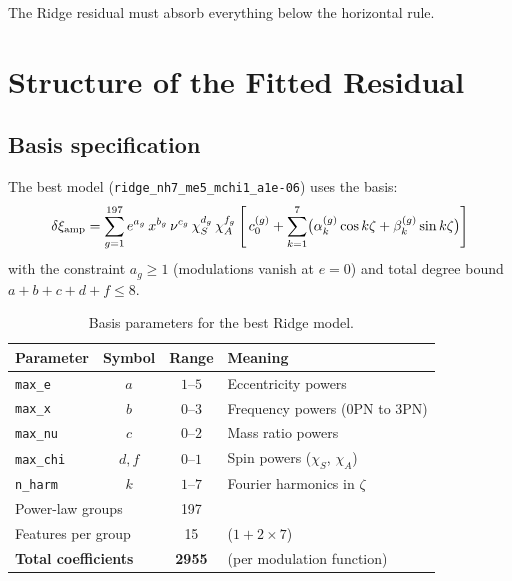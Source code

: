 \documentclass[11pt,letterpaper]{article}
\newcommand{\dxamp}{\delta\xi_{\rm amp}}
\newcommand{\chiS}{\chi_S}
\newcommand{\chiA}{\chi_A}
\begin{document}
\noindent The Ridge residual must absorb everything below the horizontal rule.

\section{Structure of the Fitted Residual}
\label{sec:residual}

\subsection{Basis specification}

The best model (\texttt{ridge\_nh7\_me5\_mchi1\_a1e-06}) uses the basis:
\begin{equation}
\dxamp = \sum_{g=1}^{197} e^{a_g}\, x^{b_g}\, \nu^{c_g}\, \chiS^{d_g}\, \chiA^{f_g} \left[\, c_0^{(g)} + \sum_{k=1}^{7} \bigl(\alpha_k^{(g)} \cos k\zeta + \beta_k^{(g)} \sin k\zeta\bigr) \right]
\label{eq:residual}
\end{equation}
with the constraint $a_g \geq 1$ (modulations vanish at $e = 0$) and total degree bound $a + b + c + d + f \leq 8$.

\begin{table}[H]
\centering
\caption{Basis parameters for the best Ridge model.}
\label{tab:basis}
\begin{tabular}{@{}lccl@{}}
\toprule
Parameter & Symbol & Range & Meaning \\
\midrule
\texttt{max\_e} & $a$ & $1$--$5$ & Eccentricity powers \\
\texttt{max\_x} & $b$ & $0$--$3$ & Frequency powers (0PN to 3PN) \\
\texttt{max\_nu} & $c$ & $0$--$2$ & Mass ratio powers \\
\texttt{max\_chi} & $d, f$ & $0$--$1$ & Spin powers ($\chiS$, $\chiA$) \\
\texttt{n\_harm} & $k$ & $1$--$7$ & Fourier harmonics in $\zeta$ \\
\midrule
\multicolumn{2}{l}{Power-law groups} & 197 & \\
\multicolumn{2}{l}{Features per group} & 15 & ($1 + 2 \times 7$) \\
\multicolumn{2}{l}{\textbf{Total coefficients}} & \textbf{2955} & (per modulation function) \\
\bottomrule
\end{tabular}
\end{table}
\end{document}
